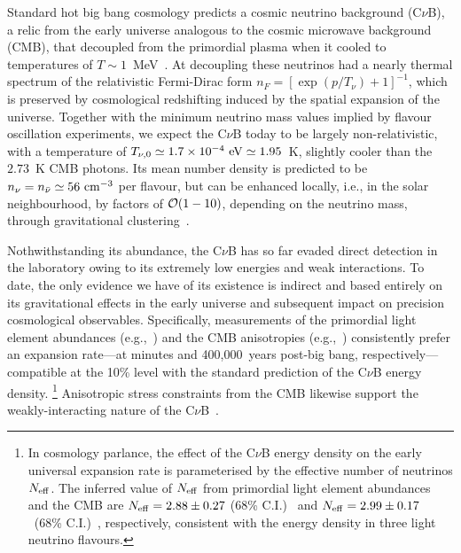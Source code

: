 \documentclass[aps,prd,10pt,twocolumn,superscriptaddress,floatfix,nofootinbib,amsmath,amssymb,altaffilletter,preprintnumbers]{revtex4-1}
\begin{document}


Standard hot big bang cosmology predicts a cosmic neutrino background (C$\nu$B), a relic from the early universe analogous to the cosmic microwave background (CMB), that decoupled from the primordial plasma when it cooled to temperatures of $T\sim 1$~MeV~\cite{ParticleDataGroup:2024cfk}. At decoupling these neutrinos had a nearly thermal spectrum of the relativistic Fermi-Dirac form $n_F = [\exp(p/T_\nu)+1]^{-1}$, which is preserved by cosmological redshifting induced by the spatial expansion of the universe. Together with the minimum neutrino mass values implied by flavour oscillation experiments, we expect the C$\nu$B today 
to be largely non-relativistic, with a temperature of $T_{\nu,0}\simeq 1.7 \times 10^{-4}~{\rm eV} \simeq 1.95$~K, slightly cooler than the $2.73$~K  CMB photons.  Its mean number density is predicted to be $n_\nu = n_{\bar{\nu}} \simeq 56~{\rm cm}^{-3}$  per flavour, but can be enhanced locally, i.e., in the solar neighbourhood, by factors of ${\cal O}(1-10)$, depending on the neutrino mass, through gravitational clustering~\cite{Singh:2002de,Ringwald:2004np,Brandbyge:2010ge, Villaescusa-Navarro:2011loy,LoVerde:2013lta,deSalas:2017wtt,Zhang:2017ljh, Mertsch:2019qjv, Holm:2023rml,Zimmer:2023jbb, Zimmer:2024max, Holm:2024zpr,Worku:2024kwv}. 

Nothwithstanding its abundance, the C$\nu$B  has so far evaded direct detection in the laboratory owing to its extremely low energies and weak interactions.  To date, the only evidence we have of its existence is indirect and based entirely on its gravitational effects in the early universe and subsequent impact on precision cosmological observables.  Specifically, measurements of the primordial light element abundances (e.g.,~\cite{Pitrou:2018cgg}) and the CMB anisotropies (e.g.,~\cite{Planck:2018vyg}) consistently prefer an expansion rate---at minutes and 400,000~years post-big bang, respectively---compatible at the 10\% level with the standard prediction of the C$\nu$B energy density.%
%
\footnote{In cosmology parlance, the effect of the C$\nu$B energy density on the early universal expansion rate is parameterised by the effective number of neutrinos $N_{\rm eff}$. The inferred value of $N_{\rm eff}$ from primordial light element abundances and the CMB are $N_{\rm eff} = 2.88 \pm 0.27$ (68\% C.I.)~\cite{Pitrou:2018cgg} and $N_{\rm eff} = 2.99 \pm 0.17$~(68\% C.I.)~\cite{Planck:2018vyg}, respectively, consistent with the energy density in three light neutrino flavours.} 
%
Anisotropic stress constraints from the CMB likewise support the weakly-interacting nature of the C$\nu$B~\cite{Oldengott:2017fhy,Chen:2022idm}.
\end{document}
